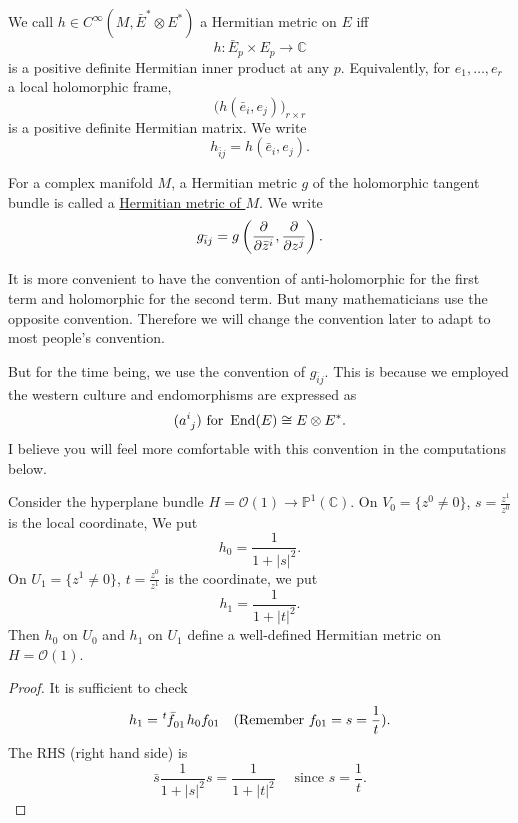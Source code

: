 \documentclass[12pt]{article}
\begin{document}
\begin{definition}
  We call \(h\in C^\infty(M,\bar{E}^*\otimes E^*)\) a Hermitian metric on \(E\) iff \[
    h:\bar{E}_p\times E_p\longrightarrow \mathbb{C}
  \] is a positive definite Hermitian inner product at any \(p\).
  Equivalently, for \(e_1,\ldots,e_r\) a local holomorphic frame, \[
    \big(h(\bar{e}_i,e_j)\big)_{r\times r}
  \] is a positive definite Hermitian matrix. We write \[
    h_{\bar{i}j}=h(\bar{e}_i,e_j)
  .\] 
\end{definition}

\begin{definition}
  For a complex manifold \(M\), a Hermitian metric \(g\) of the holomorphic tangent
  bundle is called a \underline{Hermitian metric of \(M\)}. We write \[
    g_{\bar{i}j}=g\left(\pdv{}{\bar{z}^i},\pdv{}{z^j}\right)
  .\]  
\end{definition}
\begin{remark}
  It is more convenient to have the convention of anti-holomorphic for the first
  term and holomorphic for the second term. But many mathematicians use the opposite
  convention. Therefore we will change the convention later to adapt to most
  people's convention.

  But for the time being, we use the convention of \(g_{\bar{i}j}\). This is because
  we employed the western culture and endomorphisms are expressed as \[
    (a\indices{^i_j}) \text{ for } \op{End}(E)\cong E\otimes E^*
  .\] I believe you will feel more comfortable with this convention in the 
  computations below.
\end{remark}

\begin{example}
  Consider the hyperplane bundle \(H=\mathcal{O}(1)\to \mathbb{P}^1(\mathbb{C})\).
  On \(V_0=\{z^0\neq 0\}\), \(s=\frac{z^1}{z^0}\) is the local coordinate, We put \[
    h_0=\frac{1}{1+|s|^2}
  .\] On \(U_1=\{z^1\neq 0\}\), \(t=\frac{z^0}{z^1}\) is the coordinate, we put \[
    h_1=\frac{1}{1+|t|^2}
  .\] Then \(h_0\) on \(U_0\) and \(h_1\) on \(U_1\) define a well-defined 
  Hermitian metric on \(H=\mathcal{O}(1)\).
\end{example}
\begin{proof}
  It is sufficient to check \[
    h_1=\tensor[^t]{\bar{f}}{_{01}}h_0 f_{01}\quad
    \text{(Remember }f_{01}=s=\frac{1}{t}\text{)}
  .\] The RHS (right hand side) is \[
    \bar{s}\frac{1}{1+|s|^2}s=\frac{1}{1+|t|^2}\quad \text{ since }s=\frac{1}{t}
  .\] 
\end{proof}
\end{document}

